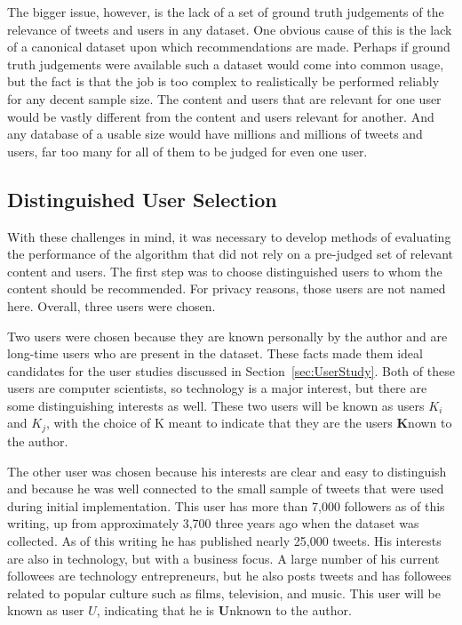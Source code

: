 The bigger issue, however, is the lack of a set of ground truth judgements of the relevance of tweets and users in any dataset. One obvious cause of this is the lack of a canonical dataset upon which recommendations are made. Perhaps if ground truth judgements were available such a dataset would come into common usage, but the fact is that the job is too complex to realistically be performed reliably for any decent sample size. The content and users that are relevant for one user would be vastly different from the content and users relevant for another. And any database of a usable size would have millions and millions of tweets and users, far too many for all of them to be judged for even one user.

\subsection{Distinguished User Selection}

With these challenges in mind, it was necessary to develop methods of evaluating the performance of the algorithm that did not rely on a pre-judged set of relevant content and users. The first step was to choose distinguished users to whom the content should be recommended. For privacy reasons, those users are not named here. Overall, three users were chosen.

Two users were chosen because they are known personally by the author and are long-time users who are present in the dataset. These facts made them ideal candidates for the user studies discussed in Section~\ref{sec:UserStudy}. Both of these users are computer scientists, so technology is a major interest, but there are some distinguishing interests as well. These two users will be known as users $K_{i}$ and $K_{j}$, with the choice of K meant to indicate that they are the users {\bf K}nown to the author.


The other user was chosen because his interests are clear and easy to distinguish and because he was well connected to the small sample of tweets that were used during initial implementation. This user has more than 7,000 followers as of this writing, up from approximately 3,700 three years ago when the dataset was collected. As of this writing he has published nearly 25,000 tweets. His interests are also in technology, but with a business focus. A large number of his current followees are technology entrepreneurs, but he also posts tweets and has followees related to popular culture such as films, television, and music. This user will be known as user $U$, indicating that he is {\bf U}nknown to the author.


